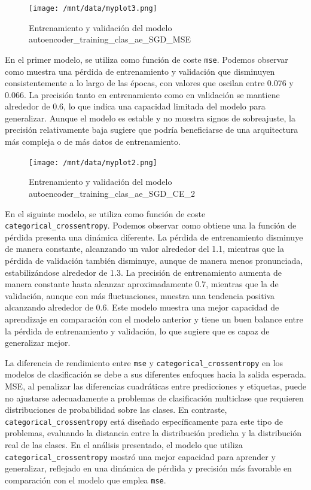 \begin{figure}[H]
    \centering
    \texttt{[image: /mnt/data/myplot3.png]}
    \caption{Entrenamiento y validación del modelo autoencoder\_training\_clas\_ae\_SGD\_MSE}
    \label{fig:sgd_mse}
\end{figure}

En el primer modelo, se utiliza como función de coste \lstinline|mse|. Podemos observar como muestra una pérdida de entrenamiento y validación que disminuyen consistentemente a lo largo de las épocas, con valores que oscilan entre 0.076 y 0.066. La precisión tanto en entrenamiento como en validación se mantiene alrededor de 0.6, lo que indica una capacidad limitada del modelo para generalizar. Aunque el modelo es estable y no muestra signos de sobreajuste, la precisión relativamente baja sugiere que podría beneficiarse de una arquitectura más compleja o de más datos de entrenamiento.

\begin{figure}[H]
    \centering
    \texttt{[image: /mnt/data/myplot2.png]}
    \caption{Entrenamiento y validación del modelo autoencoder\_training\_clas\_ae\_SGD\_CE\_2}
    \label{fig:sgd_ce}
\end{figure}

En el siguinte modelo, se utiliza como función de coste \lstinline|categorical_crossentropy|. Podemos observar como obtiene una la función de pérdida presenta una dinámica diferente. La pérdida de entrenamiento disminuye de manera constante, alcanzando un valor alrededor del 1.1, mientras que la pérdida de validación también disminuye, aunque de manera menos pronunciada, estabilizándose alrededor de 1.3. La precisión de entrenamiento aumenta de manera constante hasta alcanzar aproximadamente 0.7, mientras que la de validación, aunque con más fluctuaciones, muestra una tendencia positiva alcanzando alrededor de 0.6. Este modelo muestra una mejor capacidad de aprendizaje en comparación con el modelo anterior y tiene un buen balance entre la pérdida de entrenamiento y validación, lo que sugiere que es capaz de generalizar mejor.

La diferencia de rendimiento entre \lstinline|mse| y \lstinline|categorical_crossentropy| en los modelos de clasificación se debe a sus diferentes enfoques hacia la salida esperada. MSE, al penalizar las diferencias cuadráticas entre predicciones y etiquetas, puede no ajustarse adecuadamente a problemas de clasificación multiclase que requieren distribuciones de probabilidad sobre las clases. En contraste, \lstinline|categorical_crossentropy| está diseñado específicamente para este tipo de problemas, evaluando la distancia entre la distribución predicha y la distribución real de las clases. En el análisis presentado, el modelo que utiliza \lstinline|categorical_crossentropy| mostró una mejor capacidad para aprender y generalizar, reflejado en una dinámica de pérdida y precisión más favorable en comparación con el modelo que emplea \lstinline|mse|.



